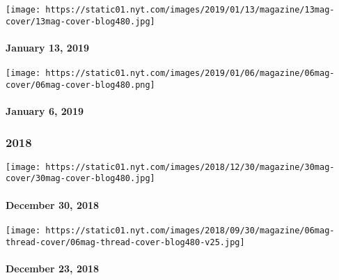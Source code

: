\href{https://www.nytimes.com/issue/magazine/2019/01/11/the-11318-issue}{}

\texttt{[image: https://static01.nyt.com/images/2019/01/13/magazine/13mag-cover/13mag-cover-blog480.jpg]}

\hypertarget{january-13-2019}{%
\paragraph{January 13, 2019}\label{january-13-2019}}

\href{https://www.nytimes.com/issue/magazine/2019/01/04/the-1619-issue}{}

\texttt{[image: https://static01.nyt.com/images/2019/01/06/magazine/06mag-cover/06mag-cover-blog480.png]}

\hypertarget{january-6-2019}{%
\paragraph{January 6, 2019}\label{january-6-2019}}

\hypertarget{2018}{%
\subsubsection{2018}\label{2018}}

\href{https://www.nytimes.com/interactive/2018/12/27/magazine/lives-they-lived-obituaries.html}{}

\texttt{[image: https://static01.nyt.com/images/2018/12/30/magazine/30mag-cover/30mag-cover-blog480.jpg]}

\hypertarget{december-30-2018}{%
\paragraph{December 30, 2018}\label{december-30-2018}}

\href{https://www.nytimes.com/issue/magazine/2019/01/03/122318-issue}{}

\texttt{[image: https://static01.nyt.com/images/2018/09/30/magazine/06mag-thread-cover/06mag-thread-cover-blog480-v25.jpg]}

\hypertarget{december-23-2018}{%
\paragraph{December 23, 2018}\label{december-23-2018}}

\href{https://www.nytimes.com/issue/magazine/2019/01/03/121618-issue}{}

